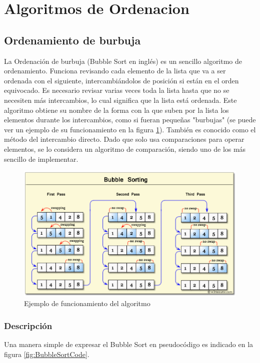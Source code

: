 \documentclass[8pt, A4]{article}    %
\begin{document}
\newpage

\section{Algoritmos de Ordenacion}

\subsection{Ordenamiento de burbuja}
La Ordenación de burbuja (Bubble Sort en inglés) es un sencillo algoritmo de ordenamiento. Funciona revisando cada elemento de la lista que va a ser ordenada con el siguiente, intercambiándolos de posición si están en el orden equivocado. Es necesario revisar varias veces toda la lista hasta que no se necesiten más intercambios, lo cual significa que la lista está ordenada. Este algoritmo obtiene su nombre de la forma con la que suben por la lista los elementos durante los intercambios, como si fueran pequeñas "burbujas" (se puede ver un ejemplo de su funcionamiento en la figura \ref{fig:BubbleSortInfo}). También es conocido como el método del intercambio directo. Dado que solo usa comparaciones para operar elementos, se lo considera un algoritmo de comparación, siendo uno de los más sencillo de implementar.

\begin{figure}[h]
\begin{center}
\includegraphics[width=1\textwidth]{graph/bubble-short-info}
\end{center}
\caption{Ejemplo de funcionamiento del algoritmo}
\label{fig:BubbleSortInfo}
\end{figure}

\subsubsection{Descripción}
Una manera simple de expresar el Bubble Sort en pseudocódigo es indicado en la figura \ref{fig:BubbleSortCode}.
\end{document}
